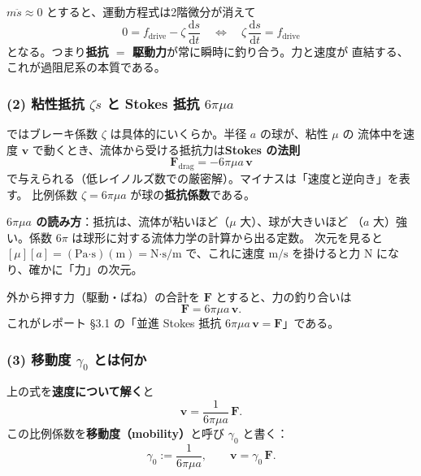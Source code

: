 \documentclass[11pt,a4paper]{article}
\newcommand{\Fv}{\bm{F}}
\newcommand{\gamz}{\gamma_{0}}
\newcommand{\dd}{\mathrm{d}}
\begin{document}
$m\ddot s\approx0$ とすると、運動方程式は2階微分が消えて
\begin{equation}
0=f_{\mathrm{drive}}-\zeta\,\frac{\dd s}{\dd t}
\quad\Longleftrightarrow\quad
\zeta\,\frac{\dd s}{\dd t}=f_{\mathrm{drive}}
\end{equation}
となる。つまり\textbf{抵抗 $=$ 駆動力}が常に瞬時に釣り合う。力と速度が
直結する、これが過阻尼系の本質である。

\subsubsection{(2) 粘性抵抗 $\zeta\dot s$ と Stokes 抵抗 $6\pi\mu a$}

ではブレーキ係数 $\zeta$ は具体的にいくらか。半径 $a$ の球が、粘性 $\mu$ の
流体中を速度 $\bm v$ で動くとき、流体から受ける抵抗力は\textbf{Stokes の法則}
\begin{equation}
\Fv_{\mathrm{drag}}=-6\pi\mu a\,\bm v
\end{equation}
で与えられる（低レイノルズ数での厳密解）。マイナスは「速度と逆向き」を表す。
比例係数 $\zeta=6\pi\mu a$ が球の\textbf{抵抗係数}である。

\begin{keybox}
\textbf{$6\pi\mu a$ の読み方}：抵抗は、流体が粘いほど（$\mu$ 大）、球が大きいほど
（$a$ 大）強い。係数 $6\pi$ は球形に対する流体力学の計算から出る定数。
次元を見ると $[\mu][a]=(\text{Pa·s})(\text{m})=\text{N·s/m}$ で、これに速度
$\text{m/s}$ を掛けると力 $\text{N}$ になり、確かに「力」の次元。
\end{keybox}

外から押す力（駆動・ばね）の合計を $\Fv$ とすると、力の釣り合いは
\begin{equation}
\Fv=6\pi\mu a\,\bm v.
\end{equation}
これがレポート §3.1 の「並進 Stokes 抵抗 $6\pi\mu a\,\bm v=\Fv$」である。

\subsubsection{(3) 移動度 $\gamz$ とは何か}

上の式を\textbf{速度について解く}と
\begin{equation}
\bm v=\frac{1}{6\pi\mu a}\,\Fv.
\end{equation}
この比例係数を\textbf{移動度（mobility）}と呼び $\gamz$ と書く：
\begin{equation}
\boxed{\;\gamz:=\frac{1}{6\pi\mu a},\qquad \bm v=\gamz\,\Fv.\;}
\end{equation}
\end{document}
